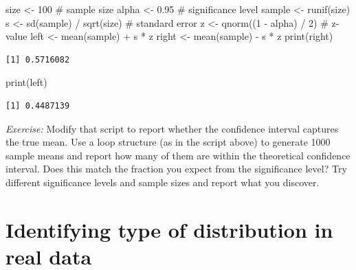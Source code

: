 \documentclass[
  letterpaper,
  DIV=11,
  numbers=noendperiod]{scrreprt}
\newenvironment{Shaded}{\begin{snugshade}}{\end{snugshade}}
\newcommand{\CommentTok}[1]{\textcolor[rgb]{0.37,0.37,0.37}{#1}}
\newcommand{\DecValTok}[1]{\textcolor[rgb]{0.68,0.00,0.00}{#1}}
\newcommand{\FloatTok}[1]{\textcolor[rgb]{0.68,0.00,0.00}{#1}}
\newcommand{\FunctionTok}[1]{\textcolor[rgb]{0.28,0.35,0.67}{#1}}
\newcommand{\NormalTok}[1]{\textcolor[rgb]{0.00,0.23,0.31}{#1}}
\newcommand{\OtherTok}[1]{\textcolor[rgb]{0.00,0.23,0.31}{#1}}
\newcommand{\SpecialCharTok}[1]{\textcolor[rgb]{0.37,0.37,0.37}{#1}}
\begin{document}
\begin{Shaded}
\begin{Highlighting}[]
\NormalTok{size }\OtherTok{\textless{}{-}} \DecValTok{100} \CommentTok{\# sample size}
\NormalTok{alpha }\OtherTok{\textless{}{-}} \FloatTok{0.95} \CommentTok{\# significance level}
\NormalTok{sample }\OtherTok{\textless{}{-}} \FunctionTok{runif}\NormalTok{(size)}
\NormalTok{s }\OtherTok{\textless{}{-}} \FunctionTok{sd}\NormalTok{(sample) }\SpecialCharTok{/} \FunctionTok{sqrt}\NormalTok{(size) }\CommentTok{\# standard error}
\NormalTok{z }\OtherTok{\textless{}{-}} \FunctionTok{qnorm}\NormalTok{((}\DecValTok{1} \SpecialCharTok{{-}}\NormalTok{ alpha) }\SpecialCharTok{/} \DecValTok{2}\NormalTok{) }\CommentTok{\# z{-}value}
\NormalTok{left }\OtherTok{\textless{}{-}} \FunctionTok{mean}\NormalTok{(sample) }\SpecialCharTok{+}\NormalTok{ s }\SpecialCharTok{*}\NormalTok{ z}
\NormalTok{right }\OtherTok{\textless{}{-}} \FunctionTok{mean}\NormalTok{(sample) }\SpecialCharTok{{-}}\NormalTok{ s }\SpecialCharTok{*}\NormalTok{ z}
\FunctionTok{print}\NormalTok{(right)}
\end{Highlighting}
\end{Shaded}

\begin{verbatim}
[1] 0.5716082
\end{verbatim}

\begin{Shaded}
\begin{Highlighting}[]
\FunctionTok{print}\NormalTok{(left)}
\end{Highlighting}
\end{Shaded}

\begin{verbatim}
[1] 0.4487139
\end{verbatim}

\emph{Exercise:} Modify that script to report whether the confidence
interval captures the true mean. Use a loop structure (as in the script
above) to generate 1000 sample means and report how many of them are
within the theoretical confidence interval. Does this match the fraction
you expect from the significance level? Try different significance
levels and sample sizes and report what you discover.

\hypertarget{identifying-type-of-distribution-in-real-data}{%
\section{Identifying type of distribution in real
data}\label{identifying-type-of-distribution-in-real-data}}
\end{document}
